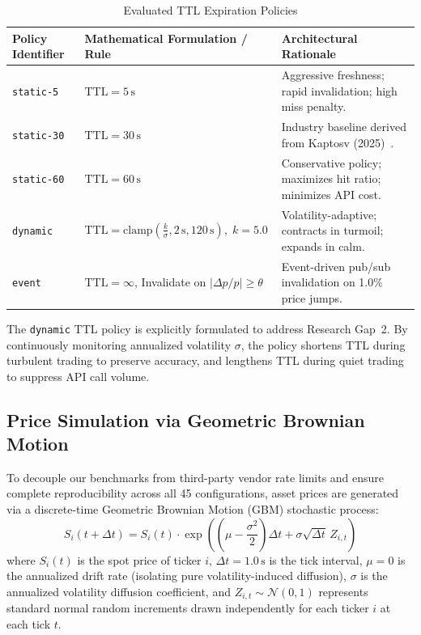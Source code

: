 \documentclass[11pt,a4paper]{article}
\begin{document}
\begin{table}[htbp]
\centering
\caption{Evaluated TTL Expiration Policies}
\label{tab:ttl_policies}
\small
\begin{tabular}{lll}
\toprule
\textbf{Policy Identifier} & \textbf{Mathematical Formulation / Rule} & \textbf{Architectural Rationale} \\
\midrule
\texttt{static-5}   & $\text{TTL} = 5\,\text{s}$ & Aggressive freshness; rapid invalidation; high miss penalty. \\
\texttt{static-30}  & $\text{TTL} = 30\,\text{s}$ & Industry baseline derived from Kaptosv (2025)~\cite{kaptosv2025}. \\
\texttt{static-60}  & $\text{TTL} = 60\,\text{s}$ & Conservative policy; maximizes hit ratio; minimizes API cost. \\
\texttt{dynamic}    & $\text{TTL} = \text{clamp}\left(\frac{k}{\sigma}, 2\,\text{s}, 120\,\text{s}\right), \; k=5.0$ & Volatility-adaptive; contracts in turmoil; expands in calm. \\
\texttt{event}      & $\text{TTL} = \infty$, Invalidate on $|\Delta p / p| \ge \theta$ & Event-driven pub/sub invalidation on 1.0\% price jumps. \\
\bottomrule
\end{tabular}
\end{table}

The \texttt{dynamic} TTL policy is explicitly formulated to address Research Gap~2. By continuously monitoring annualized volatility $\sigma$, the policy shortens TTL during turbulent trading to preserve accuracy, and lengthens TTL during quiet trading to suppress API call volume.

\subsection{Price Simulation via Geometric Brownian Motion}

To decouple our benchmarks from third-party vendor rate limits and ensure complete reproducibility across all 45 configurations, asset prices are generated via a discrete-time Geometric Brownian Motion (GBM) stochastic process:
\begin{equation}
  S_i(t + \Delta t) = S_i(t) \cdot \exp\left( \left(\mu - \frac{\sigma^2}{2}\right)\Delta t + \sigma \sqrt{\Delta t} \, Z_{i,t} \right)
  \label{eq:gbm_spec}
\end{equation}
where $S_i(t)$ is the spot price of ticker $i$, $\Delta t = 1.0\,\text{s}$ is the tick interval, $\mu = 0$ is the annualized drift rate (isolating pure volatility-induced diffusion), $\sigma$ is the annualized volatility diffusion coefficient, and $Z_{i,t} \sim \mathcal{N}(0, 1)$ represents standard normal random increments drawn independently for each ticker $i$ at each tick $t$.
\end{document}
